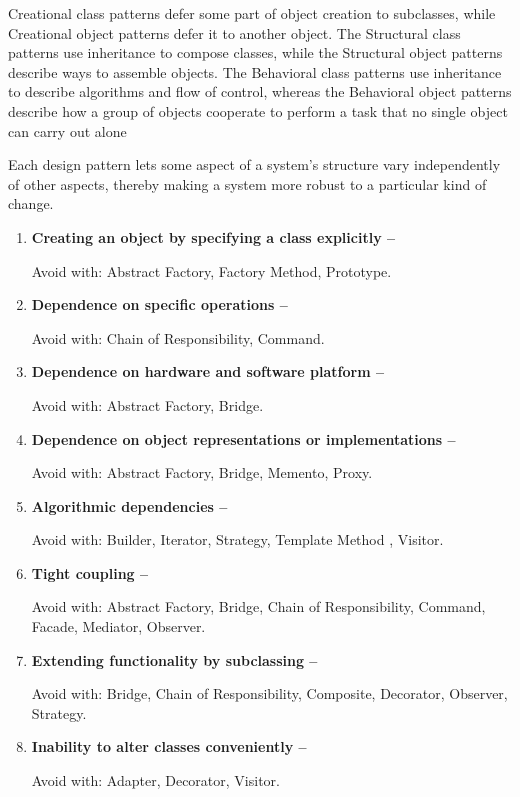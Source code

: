 \documentclass{article}
\begin{document}
Creational class patterns defer some part of object creation to subclasses, while Creational object patterns defer it to another object. The Structural class patterns use inheritance to compose classes, while the Structural object patterns describe ways to assemble objects. The Behavioral class patterns use inheritance to describe algorithms and flow of control, whereas the Behavioral object patterns describe how a group of objects cooperate to perform a task that no single object can carry out alone

Each design pattern lets some aspect of a system's structure vary independently of other aspects, thereby making a system more robust to a particular kind of change.

\begin{enumerate}
    \item \textbf{Creating an object by specifying a class explicitly -- }
    
    Avoid with: Abstract Factory, Factory Method, Prototype. 
    
    \item \textbf{Dependence on specific operations --}
    
    Avoid with: Chain of Responsibility, Command.
    
    \item \textbf{Dependence on hardware and software platform --}
    
    Avoid with: Abstract Factory, Bridge.
    
    \item \textbf{Dependence on object representations or implementations -- }
    
    Avoid with: Abstract Factory, Bridge, Memento, Proxy.
    
    \item \textbf{Algorithmic dependencies --}
    
    Avoid with: Builder, Iterator, Strategy, Template Method , Visitor.
    
    \item \textbf{Tight coupling --}
    
    Avoid with: Abstract Factory, Bridge, Chain of Responsibility, Command, Facade, Mediator, Observer.
    
    \item \textbf{Extending functionality by subclassing --}
    
    Avoid with: Bridge, Chain of Responsibility, Composite,  Decorator, Observer, Strategy.
    
    \item \textbf{Inability to alter classes conveniently --}
    
    Avoid with: Adapter, Decorator, Visitor.
\end{enumerate}
\end{document}

